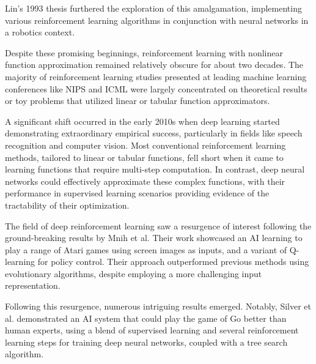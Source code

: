Lin's 1993 thesis furthered the exploration of this amalgamation, implementing various reinforcement learning algorithms in conjunction with neural networks in a robotics context.

Despite these promising beginnings, reinforcement learning with nonlinear function approximation remained relatively obscure for about two decades. The majority of reinforcement learning studies presented at leading machine learning conferences like NIPS and ICML were largely concentrated on theoretical results or toy problems that utilized linear or tabular function approximators.

A significant shift occurred in the early 2010s when deep learning started demonstrating extraordinary empirical success, particularly in fields like speech recognition and computer vision. Most conventional reinforcement learning methods, tailored to linear or tabular functions, fell short when it came to learning functions that require multi-step computation. In contrast, deep neural networks could effectively approximate these complex functions, with their performance in supervised learning scenarios providing evidence of the tractability of their optimization.

The field of deep reinforcement learning saw a resurgence of interest following the ground-breaking results by Mnih et al. Their work showcased an AI learning to play a range of Atari games using screen images as inputs, and a variant of Q-learning for policy control. Their approach outperformed previous methods using evolutionary algorithms, despite employing a more challenging input representation.

Following this resurgence, numerous intriguing results emerged. Notably, Silver et al. demonstrated an AI system that could play the game of Go better than human experts, using a blend of supervised learning and several reinforcement learning steps for training deep neural networks, coupled with a tree search algorithm.


